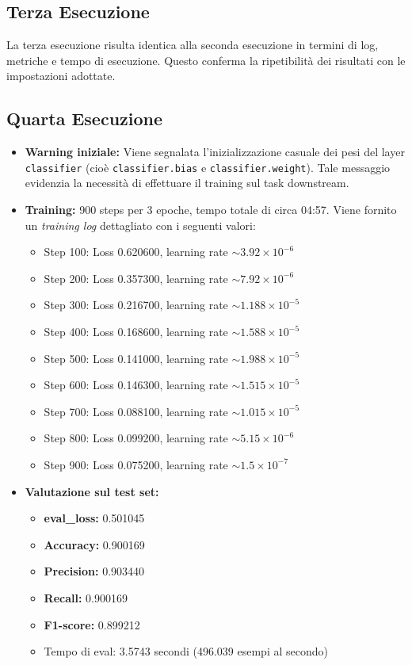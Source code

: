 \documentclass[a4paper,12pt]{article}
\begin{document}
\subsection{Terza Esecuzione }
La terza esecuzione risulta identica alla seconda esecuzione in termini di log, metriche e tempo di esecuzione. Questo conferma la ripetibilità dei risultati con le impostazioni adottate.

\subsection{Quarta Esecuzione}
\begin{itemize}
    \item \textbf{Warning iniziale:} Viene segnalata l'inizializzazione casuale dei pesi del layer \texttt{classifier} (cioè \texttt{classifier.bias} e \texttt{classifier.weight}). Tale messaggio evidenzia la necessità di effettuare il training sul task downstream.
    \item \textbf{Training:} 900 steps per 3 epoche, tempo totale di circa 04:57. Viene fornito un \textit{training log} dettagliato con i seguenti valori:
    \begin{itemize}
        \item Step 100: Loss 0.620600, learning rate $\sim 3.92 \times 10^{-6}$
        \item Step 200: Loss 0.357300, learning rate $\sim 7.92 \times 10^{-6}$
        \item Step 300: Loss 0.216700, learning rate $\sim 1.188 \times 10^{-5}$
        \item Step 400: Loss 0.168600, learning rate $\sim 1.588 \times 10^{-5}$
        \item Step 500: Loss 0.141000, learning rate $\sim 1.988 \times 10^{-5}$
        \item Step 600: Loss 0.146300, learning rate $\sim 1.515 \times 10^{-5}$
        \item Step 700: Loss 0.088100, learning rate $\sim 1.015 \times 10^{-5}$
        \item Step 800: Loss 0.099200, learning rate $\sim 5.15 \times 10^{-6}$
        \item Step 900: Loss 0.075200, learning rate $\sim 1.5 \times 10^{-7}$
    \end{itemize}
    \item \textbf{Valutazione sul test set:}
    \begin{itemize}
        \item \textbf{eval\_loss:} 0.501045
        \item \textbf{Accuracy:} 0.900169
        \item \textbf{Precision:} 0.903440
        \item \textbf{Recall:} 0.900169
        \item \textbf{F1-score:} 0.899212
        \item Tempo di eval: 3.5743 secondi (496.039 esempi al secondo)
    \end{itemize}
\end{itemize}
\end{document}
